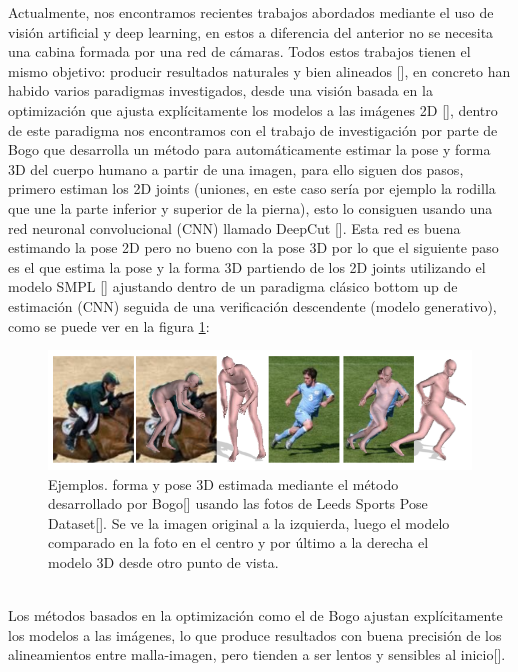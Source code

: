 Actualmente, nos encontramos recientes trabajos abordados mediante el uso de visión artificial y deep learning, en estos a diferencia del anterior no se necesita una cabina formada por una red de cámaras. Todos estos trabajos tienen el mismo objetivo: producir resultados naturales y bien alineados [\cite{pymaf}], en concreto han habido varios paradigmas investigados, desde una visión basada en la optimización que ajusta explícitamente los modelos a las imágenes 2D [\cite{keepsmpl}], dentro de este paradigma nos encontramos con el trabajo de investigación por parte de Bogo que desarrolla un método para automáticamente estimar la pose y forma 3D del cuerpo humano a partir de una imagen, para ello siguen dos pasos, primero estiman los 2D joints (uniones, en este caso sería por ejemplo la rodilla que une la parte inferior y superior de la pierna), esto lo consiguen usando una red neuronal convolucional (CNN) llamado DeepCut [\cite{deepcut}]. Esta red es buena estimando la pose 2D pero no bueno con la pose 3D por lo que el siguiente paso es el que estima la pose y la forma 3D partiendo de los 2D joints utilizando el modelo SMPL [\cite{smpl}] ajustando dentro de un paradigma clásico bottom up de estimación (CNN) seguida de una verificación descendente (modelo generativo), como se puede ver en la figura \ref{fig:figura3}:
\begin{figure}[!h]
	\centering
	\includegraphics[scale=0.7]{imagenes/estadoarte2.png}
	\caption{Ejemplos. forma y pose 3D estimada mediante el método desarrollado por Bogo[\cite{keepsmpl}] usando las fotos de Leeds Sports Pose Dataset[\cite{edafig2}]. Se ve la imagen original a la izquierda, luego el modelo comparado en la foto en el centro y por último a la derecha el modelo 3D desde otro punto de vista. }
	\label{fig:figura3}
\end{figure}
\\
Los métodos basados en la optimización como el de Bogo ajustan explícitamente los modelos a las imágenes, lo que produce resultados con buena precisión de los alineamientos entre malla-imagen, pero tienden a ser lentos y sensibles al inicio[\cite{pymaf}].

